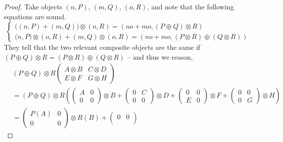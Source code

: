 \begin{proof}
Take objects $(n,P)$, $(m,Q)$, $(o,R)$, and note that the following equations
are sound.
\[
        \begin{cases}
                \big ((n,P) + (m,Q) \big ) \otimes (o,R) = (no + mo, (P
                \oplus Q) \otimes R)
                \\
                \big (n,P) \otimes (o,R) + (m,Q) \otimes (o,R) = (no + mo, 
                        (P \otimes R) \oplus (Q \otimes R))
        \end{cases}
\]
They tell that the two relevant composite objects are the same if $(P \oplus Q)
\otimes R = (P \otimes R) \oplus (Q \otimes R)$ -- and thus we reason,
        \begin{equation*}
        \begin{split}
        & (P \oplus Q) \otimes R
        \begin{pmatrix}
         A \otimes B & C \otimes D
         \\
         E \otimes F & G \otimes H
        \end{pmatrix} \\
        & =
        (P \oplus Q) \otimes R
        \left (
        \begin{pmatrix}
         A &  0
         \\
         0 & 0  
        \end{pmatrix} 
        \otimes B
        +
        \begin{pmatrix}
        0  & C
         \\
        0 & 0
        \end{pmatrix} 
        \otimes D
        +
        \begin{pmatrix}
         0 & 0
         \\
         E & 0 
        \end{pmatrix} 
        \otimes F
        +
        \begin{pmatrix}
         0 & 0
         \\
         0 & G 
        \end{pmatrix} 
        \otimes H
        \right )
        \\
        & =
        \begin{pmatrix}
         P(A) &  0
         \\
         0 & 0  
        \end{pmatrix} 
        \otimes R(B)
        +
        \begin{pmatrix}
         0 & 0
         \\

\end{pmatrix}
\end{split}
\end{equation*}
\end{proof}
